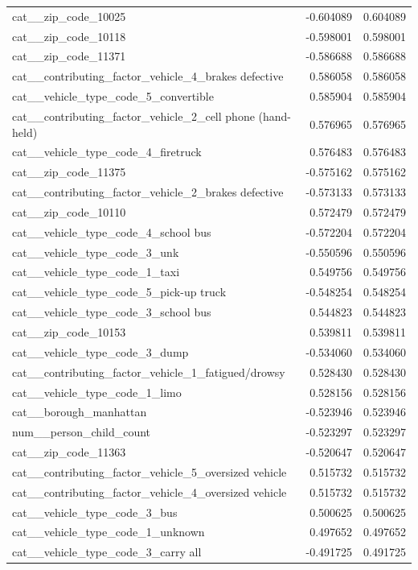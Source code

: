 \begin{tabular}{lrr}
cat__zip_code_10025 & -0.604089 & 0.604089 \\
cat__zip_code_10118 & -0.598001 & 0.598001 \\
cat__zip_code_11371 & -0.586688 & 0.586688 \\
cat__contributing_factor_vehicle_4_brakes defective & 0.586058 & 0.586058 \\
cat__vehicle_type_code_5_convertible & 0.585904 & 0.585904 \\
cat__contributing_factor_vehicle_2_cell phone (hand-held) & 0.576965 & 0.576965 \\
cat__vehicle_type_code_4_firetruck & 0.576483 & 0.576483 \\
cat__zip_code_11375 & -0.575162 & 0.575162 \\
cat__contributing_factor_vehicle_2_brakes defective & -0.573133 & 0.573133 \\
cat__zip_code_10110 & 0.572479 & 0.572479 \\
cat__vehicle_type_code_4_school bus & -0.572204 & 0.572204 \\
cat__vehicle_type_code_3_unk & -0.550596 & 0.550596 \\
cat__vehicle_type_code_1_taxi & 0.549756 & 0.549756 \\
cat__vehicle_type_code_5_pick-up truck & -0.548254 & 0.548254 \\
cat__vehicle_type_code_3_school bus & 0.544823 & 0.544823 \\
cat__zip_code_10153 & 0.539811 & 0.539811 \\
cat__vehicle_type_code_3_dump & -0.534060 & 0.534060 \\
cat__contributing_factor_vehicle_1_fatigued/drowsy & 0.528430 & 0.528430 \\
cat__vehicle_type_code_1_limo & 0.528156 & 0.528156 \\
cat__borough_manhattan & -0.523946 & 0.523946 \\
num__person_child_count & -0.523297 & 0.523297 \\
cat__zip_code_11363 & -0.520647 & 0.520647 \\
cat__contributing_factor_vehicle_5_oversized vehicle & 0.515732 & 0.515732 \\
cat__contributing_factor_vehicle_4_oversized vehicle & 0.515732 & 0.515732 \\
cat__vehicle_type_code_3_bus & 0.500625 & 0.500625 \\
cat__vehicle_type_code_1_unknown & 0.497652 & 0.497652 \\
cat__vehicle_type_code_3_carry all & -0.491725 & 0.491725 \\

\end{tabular}

